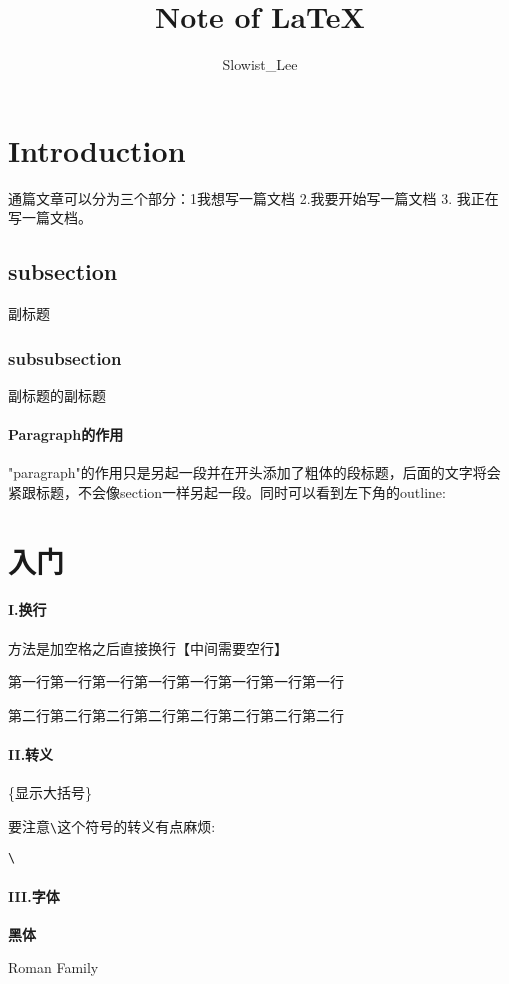 \documentclass[fontset=windows]{article}
\begin{document}
\title{Note of \LaTeX}  
\author{Slowist\_Lee}
\maketitle
\section{Introduction}
通篇文章可以分为三个部分：1我想写一篇文档 2.我要开始写一篇文档 3. 我正在写一篇文档。
\subsection{subsection}
副标题

\subsubsection{subsubsection}
副标题的副标题
\paragraph{Paragraph的作用} "paragraph"的作用只是另起一段并在开头添加了粗体的段标题，后面的文字将会紧跟标题，不会像section一样另起一段。同时可以看到左下角的outline:
\section{入门}


\paragraph{I.换行}方法是加空格之后直接换行【中间需要空行】 

	第一行第一行第一行第一行第一行第一行第一行第一行
	
第二行第二行第二行第二行第二行第二行第二行第二行
\paragraph{II.转义}
\{显示大括号\}

要注意\verb|\|这个符号的转义有点麻烦:
\begin{center}
\verb|\|
\end{center}
\paragraph{III.字体}


\textbf{黑体} 

 \textrm{Roman Family} 
\end{document}

